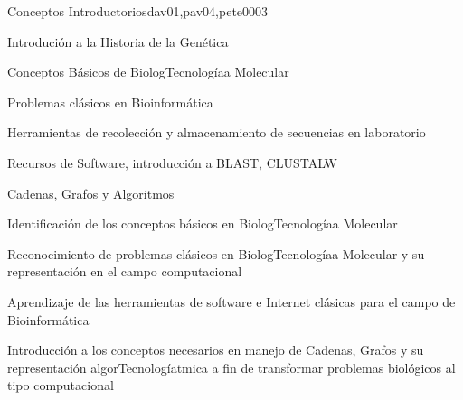 \begin{syllabus}
\begin{unit}{Conceptos Introductorios}{dav01,pav04,pete00}{0}{3}
\begin{topics}
        \item Introdución a la Historia de la Genética
        \item Conceptos Básicos de BiologTecnologíaa Molecular
        \item Problemas clásicos en Bioinformática
        \item Herramientas de recolección y almacenamiento de secuencias en laboratorio
        \item Recursos de Software, introducción a BLAST, CLUSTALW
        \item Cadenas, Grafos y Algoritmos
    \end{topics}
    \begin{unitgoals}
        \item Identificación de los conceptos básicos en BiologTecnologíaa Molecular
        \item Reconocimiento de problemas clásicos en BiologTecnologíaa Molecular y su representación en el campo computacional
        \item Aprendizaje de las herramientas de software e Internet clásicas para el campo de Bioinformática
        \item Introducción a los conceptos necesarios en manejo de Cadenas, Grafos y su representación algorTecnologíatmica a fin de transformar problemas biológicos al tipo computacional
    \end{unitgoals}
\end{unit}


\end{syllabus}
